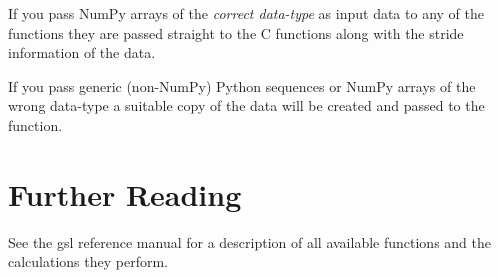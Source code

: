 If you pass NumPy arrays of the \emph{correct data-type} as input data
to any of the functions they are passed straight to the C functions
along with the stride information of the data.

If you pass generic (non-NumPy) Python sequences or NumPy arrays of the
wrong data-type a suitable copy of the data will be created and passed
to the function.


\section{Further Reading}
\label{sec:stat-further-reading}

See the gsl reference manual for a description of all available
functions and the calculations they perform.


